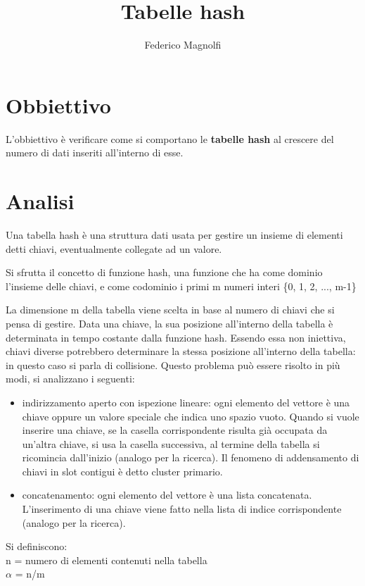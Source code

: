 \documentclass[]{article}
\begin{document}

\title{Tabelle hash}
\author{Federico Magnolfi}
\maketitle


\section{Obbiettivo}
L'obbiettivo è verificare come si comportano le \textbf{tabelle hash} al crescere del numero di dati inseriti all'interno di esse. 

\section{Analisi}
Una tabella hash è una struttura dati usata per gestire un insieme di elementi detti chiavi, eventualmente collegate ad un valore.

Si sfrutta il concetto di funzione hash, una funzione che ha come dominio l'insieme delle chiavi, e come codominio i primi m numeri interi \{0, 1, 2, ..., m-1\}

La dimensione m della tabella viene scelta in base al numero di chiavi che si pensa di gestire. Data una chiave, la sua posizione all'interno della tabella è determinata in tempo costante dalla funzione hash.
Essendo essa non iniettiva, chiavi diverse potrebbero determinare la stessa posizione all'interno della tabella: in questo caso si parla di collisione. Questo problema può essere risolto in più modi, si analizzano i seguenti:
\begin{itemize}
\item indirizzamento aperto con ispezione lineare: ogni elemento del vettore è una chiave oppure un valore speciale che indica uno spazio vuoto. Quando si vuole inserire una chiave, se la casella corrispondente risulta già occupata da un'altra chiave, si usa la casella successiva, al termine della tabella si ricomincia dall'inizio (analogo per la ricerca). Il fenomeno di addensamento di chiavi in slot contigui è detto cluster primario.
\item concatenamento: ogni elemento del vettore è una lista concatenata. L'inserimento di una chiave viene fatto nella lista di indice corrispondente (analogo per la ricerca).
\end{itemize}

Si definiscono:
\\n = numero di elementi contenuti nella tabella
\\$\alpha$ = n/m
\end{document}
